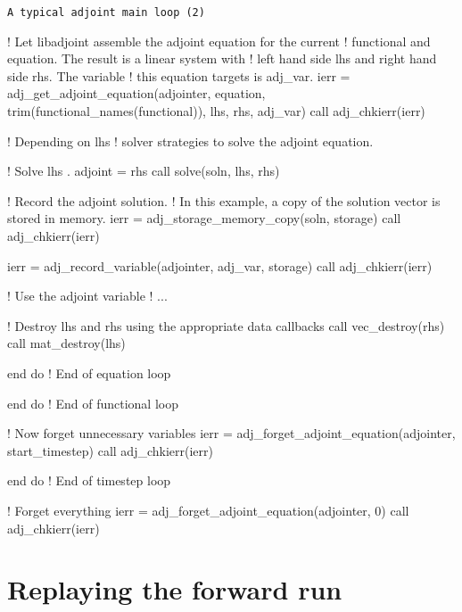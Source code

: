 \begin{boxwithtitle}{\texttt{A typical adjoint main loop (2)}}
\begin{minipage}{\columnwidth}
\begin{fortrancode}   
        ! Let libadjoint assemble the adjoint equation for the current 
        ! functional and equation. The result is a linear system with 
        ! left hand side lhs and right hand side rhs. The variable 
        ! this equation targets is adj_var. 
        ierr = adj_get_adjoint_equation(adjointer, equation, 
                                        trim(functional_names(functional)), 
                                        lhs, rhs, adj_var)
        call adj_chkierr(ierr)

        ! Depending on lhs%
        ! solver strategies to solve the adjoint equation.

        ! Solve lhs . adjoint = rhs 
        call solve(soln, lhs, rhs)

        ! Record the adjoint solution. 
        ! In this example, a copy of the solution vector is stored in memory.
        ierr = adj_storage_memory_copy(soln, storage)
        call adj_chkierr(ierr)

        ierr = adj_record_variable(adjointer, adj_var, storage)
        call adj_chkierr(ierr)

        ! Use the adjoint variable
        ! ...

        ! Destroy lhs and rhs using the appropriate data callbacks
        call vec_destroy(rhs)
        call mat_destroy(lhs)

      end do ! End of equation loop
      
    end do ! End of functional loop

    ! Now forget unnecessary variables
    ierr = adj_forget_adjoint_equation(adjointer, start_timestep)
    call adj_chkierr(ierr)

  end do ! End of timestep loop

  ! Forget everything
  ierr = adj_forget_adjoint_equation(adjointer, 0)
  call adj_chkierr(ierr)
\end{fortrancode}
\end{minipage}
\end{boxwithtitle}


\section{Replaying the forward run} \label{sec:replay}

